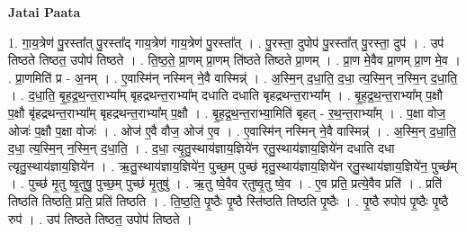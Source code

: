 \documentclass[17pt]{extarticle}
\begin{document}
\textbf{Jatai Paata} \newline

1. गा॒य॒त्रेण॑ पु॒रस्ता᳚त् पु॒रस्ता᳚द् गाय॒त्रेण॑ गाय॒त्रेण॑ पु॒रस्ता᳚त् । . पु॒रस्ता॒ दुपोप॑ पु॒रस्ता᳚त् पु॒रस्ता॒ दुप॑ । . उप॑ तिष्ठते तिष्ठत॒ उपोप॑ तिष्ठते । . ति॒ष्ठ॒ते॒ प्रा॒णम् प्रा॒णम् ति॑ष्ठते तिष्ठते प्रा॒णम् । . प्रा॒ण मे॒वैव प्रा॒णम् प्रा॒ण मे॒व । . प्रा॒णमिति॑ प्र - अ॒नम् । . ए॒वास्मि॑न् नस्मिन् ने॒वै वास्मिन्न्॑ । . अ॒स्मि॒न् द॒धा॒ति॒ द॒धा॒ त्य॒स्मि॒न् न॒स्मि॒न् द॒धा॒ति॒ । . द॒धा॒ति॒ बृ॒ह॒द्र॒थ॒न्त॒राभ्या᳚म् बृहद्रथन्त॒राभ्या᳚म् दधाति दधाति बृहद्रथन्त॒राभ्या᳚म् । . बृ॒ह॒द्र॒थ॒न्त॒राभ्या᳚म् प॒क्षौ प॒क्षौ बृ॑हद्रथन्त॒राभ्या᳚म् बृहद्रथन्त॒राभ्या᳚म् प॒क्षौ । . बृ॒ह॒द्र॒थ॒न्त॒राभ्या॒मिति॑ बृहत् - र॒थ॒न्त॒राभ्या᳚म् । . प॒क्षा वोज॒ ओजः॑ प॒क्षौ प॒क्षा वोजः॑ । . ओज॑ ए॒वै वौज॒ ओज॑ ए॒व । . ए॒वास्मि॑न् नस्मिन् ने॒वै वास्मिन्न्॑ । . अ॒स्मि॒न् द॒धा॒ति॒ द॒धा॒ त्य॒स्मि॒न् न॒स्मि॒न् द॒धा॒ति॒ । . द॒धा॒ त्यृ॒तु॒स्थाय॑ज्ञाय॒ज्ञिये॑न र्‌तु॒स्थाय॑ज्ञाय॒ज्ञिये॑न दधाति दधा त्यृतु॒स्थाय॑ज्ञाय॒ज्ञिये॑न । . ऋ॒तु॒स्थाय॑ज्ञाय॒ज्ञिये॑न॒ पुच्छ॒म् पुच्छ॑ मृतु॒स्थाय॑ज्ञाय॒ज्ञिये॑न र्‌तु॒स्थाय॑ज्ञाय॒ज्ञिये॑न॒ पुच्छ᳚म् । . पुच्छ॑ मृ॒तु ष्वृ॒तुषु॒ पुच्छ॒म् पुच्छ॑ मृ॒तुषु॑ । . ऋ॒तु ष्वे॒वैव र्‌तुष्वृ॒तु ष्वे॒व । . ए॒व प्रति॒ प्रत्ये॒वैव प्रति॑ । . प्रति॑ तिष्ठति तिष्ठति॒ प्रति॒ प्रति॑ तिष्ठति । . ति॒ष्ठ॒ति॒ पृ॒ष्ठैः पृ॒ष्ठै स्ति॑ष्ठति तिष्ठति पृ॒ष्ठैः । . पृ॒ष्ठै रुपोप॑ पृ॒ष्ठैः पृ॒ष्ठै रुप॑ । . उप॑ तिष्ठते तिष्ठत॒ उपोप॑ तिष्ठते । \newline
\end{document}

